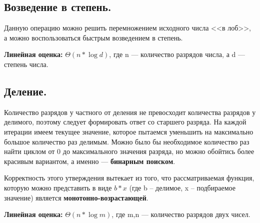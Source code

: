 \documentclass[pdf, unicode, 12pt, a4paper,oneside,fleqn]{article}
\begin{document}
\subsection{Возведение в степень.}
Данную операцию можно решить перемножением исходного числа <<в лоб>>, а можно воспользоваться быстрым возведением в степень. 

{\bf Линейная оценка: } $\Theta{(n*\log{d})}$, где n — количество разрядов числа, а d — степень числа.


\subsection{Деление.}
Количество разрядов у частного от деления не превосходит количества разрядов у делимого, поэтому следует формировать ответ со старшего разряда. На каждой итерации имеем текущее значение, которое пытаемся уменьшить на максимально большое количество раз делимым. Можно было бы необходимое количество раз найти циклом от 0 до максимального значения разряда, но можно обойтись более красивым вариантом, а именно — {\bf бинарным поиском}. 

Корректность этого утверждения вытекает из того, что рассматриваемая функция, которую можно представить в виде $b*x$ (где b – делимое, x – подбираемое значение) является {\bf монотонно-возрастающей}.

{\bf Линейная оценка: } $\Theta{(n*\log{m})}$, где m,n — количество разрядов двух чисел. 
\newpage
\end{document}
